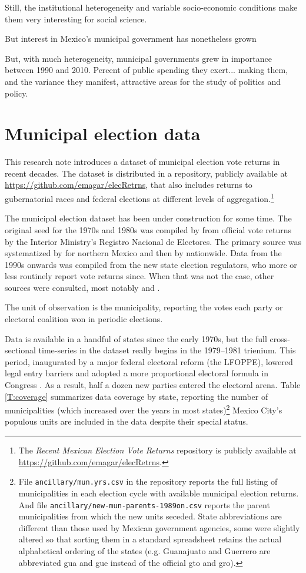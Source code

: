 \documentclass[letter,12pt]{article}
\begin{document}
Still, the institutional heterogeneity and variable socio-economic conditions make them very interesting for social science. 

But interest in Mexico's municipal government has nonetheless grown

But, with much heterogeneity, municipal governments grew in importance between 1990 and 2010. Percent of public spending they exert... making them, and the variance they manifest, attractive areas for the study of politics and policy. 

\section{Municipal election data}
This research note introduces a dataset of municipal election vote returns in recent decades. The dataset is distributed in a repository, publicly available at \url{https://github.com/emagar/elecRetrns}, that also includes returns to gubernatorial races and federal elections at different levels of aggregation.\footnote{The \emph{Recent Mexican Election Vote Returns} repository is publicly available at \url{https://github.com/emagar/elecRetrns}.} 

The municipal election dataset has been under construction for some time. The original seed for the 1970s and 1980s was compiled by \citet{molinar.1991a} from official vote returns by the Interior Ministry's Registro Nacional de Electores. The primary source was systematized by \citet{magar.1994} for northern Mexico and then by \citet{varela.2004} nationwide. Data from the 1990s onwards was compiled from the new state election regulators, who more or less routinely report vote returns since. When that was not the case, other sources were consulted, most notably \citet{revista.voz.y.voto} and \citet{cede.uam.izt}.

The unit of observation is the municipality, reporting the votes each party or electoral coalition won in periodic elections.

Data is available in a handful of states since the early 1970s, but the full cross-sectional time-series in the dataset really begins in the 1979--1981 trienium. This period, inaugurated by a major federal electoral reform (the LFOPPE), lowered legal entry barriers and adopted a more proportional electoral formula in Congress \citep[:116]{molinar.1991a}. As a result, half a dozen new parties entered the electoral arena. Table \ref{T:coverage} summarizes data coverage by state, reporting the number of municipalities (which increased over the years in most states)\footnote{File \verb|ancillary/mun.yrs.csv| in the repository reports the full listing of municipalities in each election cycle with available municipal election returns. And file \verb|ancillary/new-mun-parents-1989on.csv| reports the parent municipalities from which the new units seceded. State abbreviations are different than those used by Mexican government agencies, some were slightly altered so that sorting them in a standard spreadsheet retains the actual alphabetical ordering of the states (e.g. Guanajuato and Guerrero are abbreviated gua and gue instead of the official gto and gro).} Mexico City's populous units are included in the data despite their special status.
\end{document}
